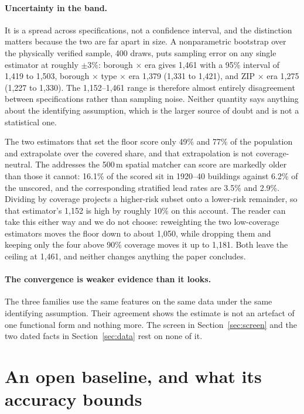 \documentclass[11pt]{article}
\begin{document}
\paragraph{Uncertainty in the band.}
It is a spread across specifications, not a confidence interval, and the distinction matters
because the two are far apart in size. A nonparametric bootstrap over the physically verified
sample, 400 draws, puts sampling error on any single estimator at roughly $\pm 3\%$: borough
$\times$ era gives 1,461 with a 95\% interval of 1,419 to 1,503, borough $\times$ type
$\times$ era 1,379 (1,331 to 1,421), and ZIP $\times$ era 1,275 (1,227 to 1,330). The
1,152--1,461 range is therefore almost entirely disagreement between specifications rather
than sampling noise. Neither quantity says anything about the identifying assumption, which is
the larger source of doubt and is not a statistical one.

The two estimators that set the floor score only 49\% and 77\% of the population and
extrapolate over the covered share, and that extrapolation is not coverage-neutral. The
addresses the 500\,m spatial matcher can score are markedly older than those it cannot: 16.1\%
of the scored sit in 1920--40 buildings against 6.2\% of the unscored, and the corresponding
stratified lead rates are 3.5\% and 2.9\%. Dividing by coverage projects a higher-risk subset
onto a lower-risk remainder, so that estimator's 1,152 is high by roughly 10\% on this account.
The reader can take this either way and we do not choose: reweighting the two low-coverage
estimators moves the floor down to about 1,050, while dropping them and keeping only the four
above 90\% coverage moves it up to 1,181. Both leave the ceiling at 1,461, and neither changes
anything the paper concludes.

\paragraph{The convergence is weaker evidence than it looks.}
The three families use the same features on the same data under the same identifying
assumption. Their agreement shows the estimate is not an artefact of one functional form and
nothing more. The screen in Section~\ref{sec:screen} and the two dated facts in
Section~\ref{sec:data} rest on none of it.

\section{An open baseline, and what its accuracy bounds}\label{sec:baseline}
\end{document}
